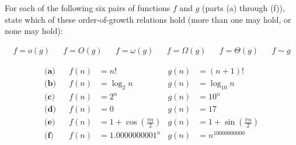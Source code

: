\documentclass[12pt,twoside]{article}
\begin{document}
\begin{problem}{20}
For each of the following six pairs of functions $f$ and $g$ (parts (a) through (f)), state which of these order-of-growth relations hold (more than one may hold, or none may hold):

\begin{align*}
 f = o(g) && f=O(g) && f=\omega(g) && f=\Omega(g) && f=\Theta(g) && f \sim g
\end{align*}

\begin{align*}
\textbf{(a)}&& f(n) &= n!  &g(n) & = (n+1)! \\
\textbf{(b)}&& f(n) &= \log_2 n &  g(n) &= \log_{10} n \\
\textbf{(c)}&& f(n) &= 2^n & g(n) &= 10^n\\
\textbf{(d)}&& f(n) &= 0 & g(n) &= 17\\
\textbf{(e)}&& f(n) &= 1+\cos\left(\frac{\pi n}{2}\right) & g(n) &= 1+\sin\left(\frac{\pi n}{2}\right)\\
\textbf{(f)}&& f(n) &= {1.0000000001}^n & g(n) &= n^{10000000000}\\
\end{align*}

\end{problem}
\end{document}
